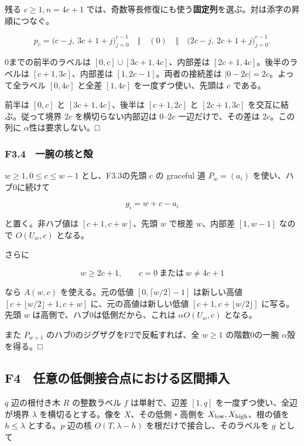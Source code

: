 \documentclass[
  10pt,
  a4paper,
]{article}
\begin{document}
残る \(c\ge1,n=4c+1\)
では、奇数等長修復にも使う\textbf{固定列}を選ぶ。対は添字の昇順につなぐ。

\[
p_c=
\bigl(c-j,\ 3c+1+j\bigr)_{j=0}^{c-1}
\quad\Vert\quad(0)\quad\Vert\quad
\bigl(2c-j,\ 2c+1+j\bigr)_{j=0}^{c-1}.
\tag{F3.3}
\]

0までの前半のラベルは \([0,c]\cup[3c+1,4c]\)、内部差は
\([2c+1,4c]\)。後半のラベルは \([c+1,3c]\)、内部差は
\([1,2c-1]\)。両者の接続差は \(|0-2c|=2c\)。よって全ラベル \([0,4c]\)
と全差 \([1,4c]\) を一度ずつ使い、先頭は \(c\) である。

前半は \([0,c]\) と \([3c+1,4c]\)、後半は \([c+1,2c]\) と \([2c+1,3c]\)
を交互に結ぶ。従って境界 \(2c\) を横切らない内部辺は \(0\)--\(2c\)
一辺だけで、その差は \(2c\)。この列に \(\alpha\)性は要求しない。□

\subsubsection{F3.4　一腕の核と殻}\label{f3.4-ux4e00ux8155ux306eux6838ux3068ux6bbb}

\(w\ge1,0\le c\le w-1\) とし、F3.3の先頭 \(c\) の graceful 道
\(P_w=(a_i)\) を使い、ハブ0に続けて

\[
g_i=w+c-a_i
\tag{F3.4}
\]

と置く。非ハブ値は \([c+1,c+w]\)、先頭 \(w\) で根差 \(w\)、内部差
\([1,w-1]\) なので \(O(U_w,c)\) となる。

さらに

\[
w\ge2c+1,\qquad c=0\ \text{または}\ w\ne4c+1
\tag{F3.5}
\]

なら \(A(w,c)\) を使える。元の低値 \([0,\lceil w/2\rceil-1]\)
は新しい高値 \([c+\lfloor w/2\rfloor+1,c+w]\) に、元の高値は新しい低値
\([c+1,c+\lfloor w/2\rfloor]\) に写る。先頭 \(w\)
は高側で、ハブ0は低側だから、これは \(\alpha O(U_w,c)\) となる。

また \(P_{w+1}\) のハブ0のジグザグをF2で反転すれば、全 \(w\ge1\)
の階数0の一腕 \(\alpha\)殻を得る。□

\subsection{F4　任意の低側接合点における区間挿入}\label{f4-ux4efbux610fux306eux4f4eux5074ux63a5ux5408ux70b9ux306bux304aux3051ux308bux533aux9593ux633fux5165}

\(q\) 辺の根付き木 \(R\) の整数ラベル \(f\) は単射で、辺差 \([1,q]\)
を一度ずつ使い、全辺が境界 \(\lambda\) を横切るとする。像を
\(X\)、その低側・高側を \(X_{\rm low},X_{\rm high}\)、根の値を
\(h\le\lambda\) とする。\(p\) 辺の核 \(O(T,\lambda-h)\)
を根だけで接合し、そのラベルを \(g\) として
\end{document}
